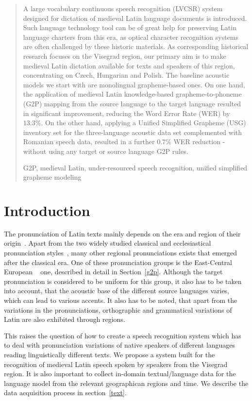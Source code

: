 \documentclass[runningheads,a4paper]{llncs}
\newcommand{\keywords}[1]{\par\addvspace\baselineskip
\noindent\keywordname\enspace\ignorespaces#1}
\begin{document}
%
%
%
%
\begin{abstract}
A large vocabulary continuous speech recognition (LVCSR) system designed for dictation of medieval Latin language documents is introduced.
Such language technology tool can be of great help for preserving Latin language charters from this era, as optical character recognition systems are often challenged by these historic materials.
As corresponding historical research focuses on the Visegrad region, our primary aim is to make medieval Latin dictation available for texts and speakers of this region, concentrating on Czech, Hungarian and Polish.
The baseline acoustic models we start with are monolingual grapheme-based ones. 
On one hand, the application of medieval Latin knowledge-based grapheme-to-phoneme (G2P) mapping from the source language to the target language resulted in significant improvement, reducing the Word Error Rate (WER) by $13.3\%$. 
On the other hand, applying a Unified Simplified Grapheme (USG) inventory set for the three-language acoustic data set complemented with Romanian speech data, resulted in a further $0.7\%$ WER reduction - without using any target or source language G2P rules.
\keywords{G2P, medieval Latin, under-resourced speech recognition, unified simplified grapheme modeling}
\end{abstract}

\section{Introduction}
The pronunciation of Latin texts mainly depends on the era and region of their origin~\cite{regional}.
Apart from the two widely studied classical and ecclesiastical pronunciation styles~\cite{allen78}, many other regional pronunciations exists that emerged after the classical era.
One of these pronunciation groups is the East-Central European ~\cite{regional} one, described in detail in Section~\ref{g2p}.
Although the target pronunciation is considered to be uniform for this group, it also has to be taken into account, that the acoustic base of the different source languages varies, which can lead to various accents.
It also has to be noted, that apart from the variations in the pronunciations, orthographic and grammatical variations of Latin are also exhibited through regions.

This raises the question of how to create a speech recognition system which has to deal with pronunciation variations of native speakers of different languages reading linguistically different texts.
We propose a system built for the recognition of medieval Latin speech spoken by speakers from the Visegrad region.
It is also important to collect in-domain textual/language data for the language model from the relevant geographican regions and time.
We describe the data acquisition process in section~\ref{text}.
\end{document}
